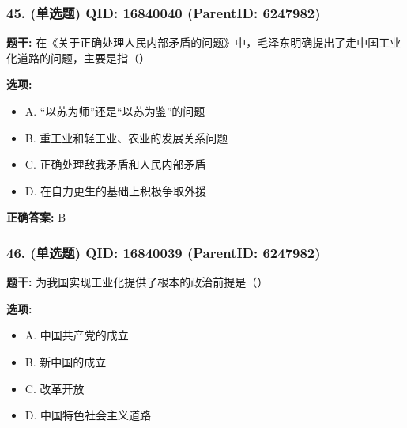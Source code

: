 \documentclass[12pt,UTF8]{ctexart}
\begin{document}
\vspace{0.3em}\hrulefill\vspace{0.7em}

\subsubsection*{45. (单选题) \small QID: 16840040 (ParentID: 6247982)}

\textbf{题干:}
在《关于正确处理人民内部矛盾的问题》中，毛泽东明确提出了走中国工业化道路的问题，主要是指（）



\textbf{选项:}
\begin{itemize}[leftmargin=*]

  \item A. “以苏为师”还是“以苏为鉴”的问题

  \item B. 重工业和轻工业、农业的发展关系问题

  \item C. 正确处理敌我矛盾和人民内部矛盾

  \item D. 在自力更生的基础上积极争取外援

\end{itemize}

\textbf{正确答案:}
B

\vspace{0.3em}\hrulefill\vspace{0.7em}

\subsubsection*{46. (单选题) \small QID: 16840039 (ParentID: 6247982)}

\textbf{题干:}
为我国实现工业化提供了根本的政治前提是（）



\textbf{选项:}
\begin{itemize}[leftmargin=*]

  \item A. 中国共产党的成立

  \item B. 新中国的成立

  \item C. 改革开放

  \item D. 中国特色社会主义道路

\end{itemize}
\end{document}
